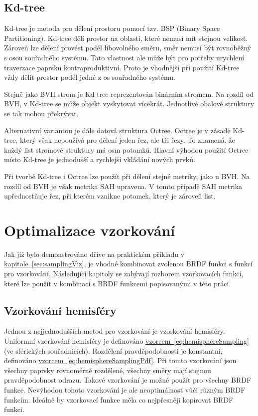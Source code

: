 \documentclass[czech,master]{diploma}
\begin{document}
\subsection{Kd-tree}
Kd-tree je metoda pro dělení prostoru pomocí tzv. BSP (Binary Space Partitioning). Kd-tree dělí prostor na oblasti, které nemusí mít stejnou velikost. Zároveň lze dělení provést podél libovolného směru, směr nemusí být rovnoběžný s osou souřadného systému. Tato vlastnost ale může být pro potřeby urychlení traverzace paprsku kontraproduktivní. Proto je vhodnější při použití Kd-tree vždy dělit prostor podél jedné z os souřadného systému.\par
Stejně jako BVH strom je Kd-tree reprezentován binárním stromem. Na rozdíl od BVH, v Kd-tree se může objekt vyskytovat vícekrát. Jednotlivé obalové struktury se tak mohou překrývat.\par
Alternativní variantou je dále datová struktura Octree. Octree je v zásadě Kd-tree, který však nepoužívá pro dělení jeden řez, ale tři řezy. To znamená, že každý list stromové struktury má osm potomků. Hlavní výhodou použití Octree místo Kd-tree je jednodušší a rychlejší vkládání nových prvků.\par
Při tvorbě Kd-tree i Octree lze použít při dělení stejné metriky, jako u BVH. Na rozdíl od BVH je však metrika SAH upravena. V tomto případě SAH metrika upřednostňuje řez, při kterém vznikne potomek, který je zároveň list.


\section{Optimalizace vzorkování}
Jak již bylo demonstrováno dříve na praktickém příkladu v \hyperref[sec:samplingViz]{kapitole~\ref{sec:samplingViz}}, je vhodné kombinovat zvolenou BRDF funkci s funkcí pro vzorkování. Následující kapitoly se zabývají rozborem vzorkovacích funkcí, které lze použít v kombinaci s BRDF funkcemi popisovanými v této práci.

\subsection{Vzorkování hemisféry} \label{sec:hemisphere}
Jednou z nejjednodušších metod pro vzorkování je vzorkování hemisféry. Uniformní vzorkování hemisféry je definováno \hyperref[eq:hemisphereSampling]{vzorcem~\ref{eq:hemisphereSampling}} (ve sférických souřadnicích). Rozdělení pravděpodobnosti je konstantní, definováno \hyperref[eq:hemisphereSamplingPdf]{vzorcem~\ref{eq:hemisphereSamplingPdf}}. Při tomto vzorkování jsou všechny paprsky rovnoměrně rozdělené, všechny směry mají stejnou pravděpodobnost odrazu. Takové vzorkování je možné použít pro všechny BRDF funkce. Nevýhodou tohoto vzorkování je ale neoptimálnost vůči různým BRDF funkcím. Ideálně by vzorkovací funkce měla co nejpřesněji kopírovat BRDF funkci.\par
\end{document}
